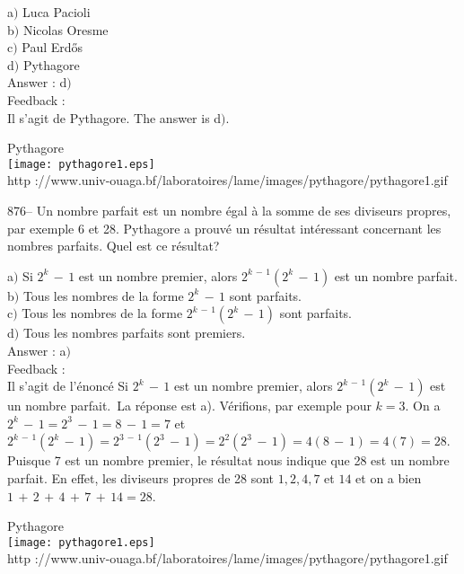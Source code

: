 \documentclass[letterpaper, 12pt]{article}
\begin{document}
a$)$ Luca Pacioli \\
b$)$ Nicolas Oresme \\
c$)$ Paul Erd\H{o}s \\
d$)$ Pythagore \\

Answer : d$)$\\

Feedback : \\
Il s'agit de Pythagore. The answer is d$)$.\\

        \begin{center}
        Pythagore\\
    \texttt{[image: pythagore1.eps]}\\
        {\footnotesize http
://www.univ-ouaga.bf/laboratoires/lame/images/pythagore/pythagore1.gif}
    \end{center}

876-- Un nombre parfait est un nombre \'egal \`a la somme de ses
diviseurs propres, par exemple 6 et 28. Pythagore a prouv\'e un
r\'esultat int\'eressant concernant les nombres parfaits. Quel est
ce r\'esultat?

a$)$ Si $2^k\,-\,1$ est un nombre premier, alors $2^{k\,-\,1}(2^k\,-\,1)$
est un nombre parfait. \\
b$)$ Tous les nombres de la forme $2^k\,-\,1$ sont parfaits. \\
c$)$ Tous les nombres de la forme $2^{k\,-\,1}(2^k\,-\,1)$ sont parfaits. \\
d$)$ Tous les nombres parfaits sont premiers.\\

Answer : a$)$\\

Feedback : \\
Il s'agit de l'\'enonc\'e \og Si $2^k\,-\,1$ est un nombre premier,
alors $2^{k\,-\,1}(2^k\,-\,1)$ est un nombre parfait.\fg\ La
r\'eponse est a). V\'erifions, par exemple pour $k=3$. On a
$2^k\,-\,1=2^3\,-\,1=8\,-\,1=7$ et
$2^{k\,-\,1}(2^k\,-\,1)=2^{3\,-\,1}(2^3\,-\,1)=2^2(2^3\,-\,1)=4(8\,-\,1)=4(7)=28$.
Puisque 7 est un nombre premier, le r\'esultat nous indique que 28
est un nombre parfait. En effet, les diviseurs propres de 28 sont
$1,2,4,7$ et $14$ et on a bien
$1\,+\,2\,+\,4\,+\,7\,+\,14=28$.\\

        \begin{center}
        Pythagore\\
    \texttt{[image: pythagore1.eps]}\\
        {\footnotesize http
://www.univ-ouaga.bf/laboratoires/lame/images/pythagore/pythagore1.gif}
    \end{center}
\end{document}
